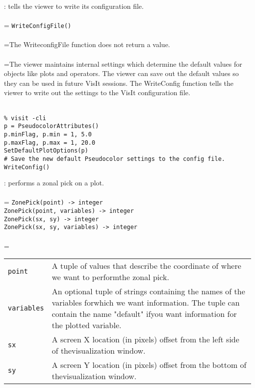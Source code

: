 \documentclass[10pt,a4paper]{report}
\begin{document}
{}
: tells the viewer to write its configuration file.\\[-3mm]

 \\ 
\hangindent=\parindent 
\verb!WriteConfigFile()!\\ [-3mm]

 \\ 
\hangindent=\parindent The WriteconfigFile function does not return a value. \\[-3mm] 

 \\ 
\hangindent=\parindent The viewer maintains internal settings which determine the default values for objects like plots and operators. The viewer can save out the default values so they can be used in future VisIt sessions. The WriteConfig function tells the viewer to write out the settings to the VisIt configuration file. \\[-3mm] 

\\[-6mm]
\begin{verbatim}% visit -cli
p = PseudocolorAttributes()
p.minFlag, p.min = 1, 5.0
p.maxFlag, p.max = 1, 20.0
SetDefaultPlotOptions(p)
# Save the new default Pseudocolor settings to the config file.
WriteConfig()
\end{verbatim}
\newpage


{}
: performs a zonal pick on a plot.\\[-3mm]

 \\ 
\hangindent=\parindent 
\verb!ZonePick(point) -> integer!\\ 
\verb!ZonePick(point, variables) -> integer!\\ 
\verb!ZonePick(sx, sy) -> integer!\\ 
\verb!ZonePick(sx, sy, variables) -> integer!\\ [-3mm]

 \\ 
\hangindent=\parindent 
\begin{tabular}{lp{9cm}}
\verb!point! & A tuple of values that describe the coordinate of where we want to performthe zonal pick. \\
\verb!variables! & An optional tuple of strings containing the names of the variables forwhich we want information. The tuple can contain the name "default" ifyou want information for the plotted variable. \\
\verb!sx! & A screen X location (in pixels) offset from the left side of thevisualization window. \\
\verb!sy! & A screen Y location (in pixels) offset from the bottom of thevisualization window. \\
\end{tabular} \\[-2mm]
\end{document}
